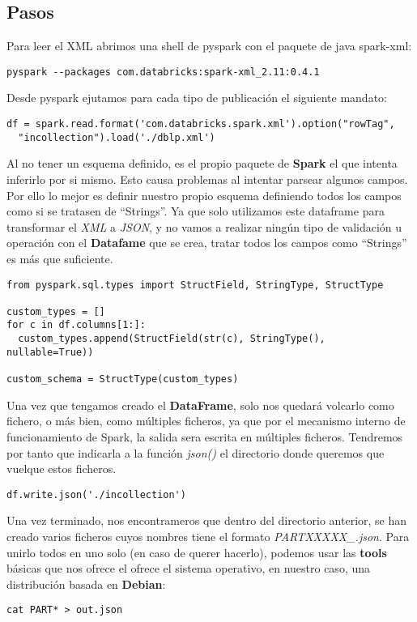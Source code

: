 \subsection{Pasos}

Para leer el XML abrimos una shell de pyspark con el paquete de java spark-xml:

\begin{verbatim}
pyspark --packages com.databricks:spark-xml_2.11:0.4.1
\end{verbatim}

Desde pyspark ejutamos para cada tipo de publicación el siguiente mandato:

\begin{verbatim}
df = spark.read.format('com.databricks.spark.xml').option("rowTag",
  "incollection").load('./dblp.xml')
\end{verbatim}

Al no tener un esquema definido, es el propio paquete de \textbf{Spark} el que intenta inferirlo por si mismo. Esto causa problemas al intentar parsear algunos campos. Por ello lo mejor es definir nuestro propio esquema definiendo todos los campos como si se tratasen de ``Strings''. Ya que solo utilizamos este dataframe para transformar el \textit{XML} a \textit{JSON}, y no vamos a realizar ningún tipo de validación u operación con el \textbf{Datafame} que se crea, tratar todos los campos como ``Strings'' es más que suficiente.

\begin{verbatim}
from pyspark.sql.types import StructField, StringType, StructType

custom_types = []
for c in df.columns[1:]:
  custom_types.append(StructField(str(c), StringType(), nullable=True))

custom_schema = StructType(custom_types)
\end{verbatim}

Una vez que tengamos creado el \textbf{DataFrame}, solo nos quedará volcarlo como fichero, o más bien, como múltiples ficheros, ya que por el mecanismo interno de funcionamiento de Spark, la salida sera escrita en múltiples ficheros. Tendremos por tanto que indicarla a la función \textit{json()} el directorio donde queremos que vuelque estos ficheros.

\begin{verbatim}
df.write.json('./incollection')
\end{verbatim}

Una vez terminado, nos encontrameros que dentro del directorio anterior, se han creado varios ficheros cuyos nombres tiene el formato \textit{PARTXXXXX\_\*.json}. Para unirlo todos en uno solo (en caso de querer hacerlo), podemos usar las \textbf{tools} básicas que nos ofrece el ofrece el sistema operativo, en nuestro caso, una distribución basada en \textbf{Debian}:

\begin{verbatim}
cat PART* > out.json
\end{verbatim}